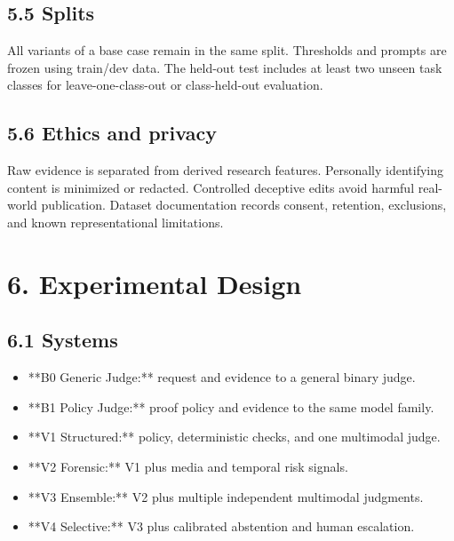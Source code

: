 \documentclass[11pt]{article}
\begin{document}
\subsection{5.5 Splits}

All variants of a base case remain in the same split. Thresholds and prompts are frozen using train/dev data. The held-out test includes at least two unseen task classes for leave-one-class-out or class-held-out evaluation.\par

\subsection{5.6 Ethics and privacy}

Raw evidence is separated from derived research features. Personally identifying content is minimized or redacted. Controlled deceptive edits avoid harmful real-world publication. Dataset documentation records consent, retention, exclusions, and known representational limitations.\par

\section{6. Experimental Design}

\subsection{6.1 Systems}

\begin{itemize}\item **B0 Generic Judge:** request and evidence to a general binary judge.\end{itemize}
\begin{itemize}\item **B1 Policy Judge:** proof policy and evidence to the same model family.\end{itemize}
\begin{itemize}\item **V1 Structured:** policy, deterministic checks, and one multimodal judge.\end{itemize}
\begin{itemize}\item **V2 Forensic:** V1 plus media and temporal risk signals.\end{itemize}
\begin{itemize}\item **V3 Ensemble:** V2 plus multiple independent multimodal judgments.\end{itemize}
\begin{itemize}\item **V4 Selective:** V3 plus calibrated abstention and human escalation.\end{itemize}
\end{document}
